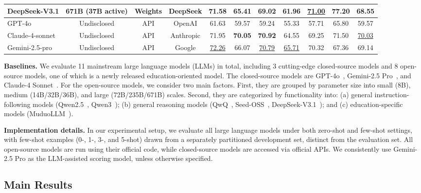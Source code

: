 \begin{table}[tbp]
{\begin{tabular}{lccc|cccccc|c}
            DeepSeek\mbox{-}V3.1  & 671B (37B active) &Weights& DeepSeek & 71.58 & 65.41 & 69.02 & 61.96 & \underline{71.00} & \textbf{77.20} & 68.55 \\
            \midrule
            GPT\mbox{-}4o & Undisclosed & API & OpenAI & 61.63 & 59.57 & 59.24 & 55.33 & 57.71 & 65.80 & 59.57 \\
            Claude\mbox{-}4\mbox{-}sonnet  & Undisclosed & API & Anthropic        & 71.95 & \textbf{70.05} & \textbf{70.92} & 64.55 & 69.25 & 71.50 & \underline{70.03} \\
            Gemini\mbox{-}2.5\mbox{-}pro & Undisclosed & API & Google      & \underline{72.26} & 66.07 & \underline{70.79} & \underline{65.71} & 70.32 & 67.36 & 69.14 \\
            \bottomrule
        \end{tabular}}
    \label{tab:main_results_cd}
    \vspace{-6mm}
\end{table}

\textbf{Baselines.}
We evaluate 11 mainstream large language models (LLMs) in total, including 3 cutting-edge closed-source models and 8 open-source models, one of which is a newly released education-oriented model. The closed-source models are GPT-4o~\citep{hurst2024gpt-4o}, Gemini-2.5 Pro~\citep{comanici2025gemini}, and Claude-4 Sonnet~\citep{claude4sonnet}. For the open-source models, we consider two main factors. First, they are grouped by parameter size into small (8B), medium (14B/32B/36B), and large (72B/235B/671B) scales. Second, they are categorized by functionality into: (a) general instruction-following models (Qwen2.5~\citep{qwen2.5}, Qwen3~\citep{yang2025qwen3}); (b) general reasoning models (QwQ~\citep{qwq32b}, Seed-OSS~\citep{seed2025seed-oss}, DeepSeek-V3.1~\citep{liu2024deepseek-v3}); and (c) education-specific models (MuduoLLM~\citep{muduollm2025}).

\textbf{Implementation details.}
In our experimental setup, we evaluate all large language models under both zero-shot and few-shot settings, with few-shot examples (0-, 1-, 3-, and 5-shot) drawn from a separately partitioned development set, distinct from the evaluation set. All open-source models are run using their official code, while closed-source models are accessed via official APIs. We consistently use Gemini-2.5 Pro as the LLM-assisted scoring model, unless otherwise specified.

\subsection{Main Results}

